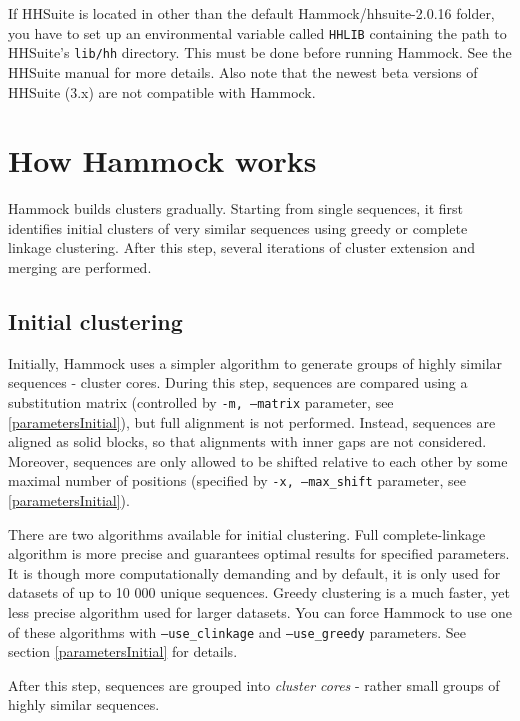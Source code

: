 \documentclass[11pt, a4paper, twoside, titlepage]{article}
\begin{document}
If HHSuite is located in other than the default Hammock/hhsuite-2.0.16 folder, you have to set up an environmental variable called \texttt{HHLIB} containing the path to HHSuite's \texttt{lib/hh} directory. This must be done before running Hammock. See the HHSuite manual for more details. Also note that the newest beta versions of HHSuite (3.x) are not compatible with Hammock. 


\section{How Hammock works}
\label{howhammockworks}
Hammock builds clusters gradually. Starting from single sequences, it first identifies initial clusters of very similar sequences using greedy or complete linkage clustering. After this step, several iterations of cluster extension and merging are performed.

\subsection{Initial clustering}
Initially, Hammock uses a simpler algorithm to generate groups of highly similar sequences - cluster cores. During this step, sequences are compared using a substitution matrix (controlled by \texttt{-m, --matrix} parameter, see \ref{parametersInitial}), but full alignment is not performed. Instead, sequences are aligned as solid blocks, so that alignments with inner gaps are not considered. Moreover, sequences are only allowed to be shifted relative to each other by some maximal number of positions (specified by \texttt{-x, --max\_shift} parameter, see \ref{parametersInitial}). 

There are two algorithms available for initial clustering. Full complete-linkage algorithm is more precise and guarantees optimal results for specified parameters. It is though more computationally demanding and by default, it is only used for datasets of up to 10 000 unique sequences. Greedy clustering is a much faster, yet less precise algorithm used for larger datasets. You can force Hammock to use one of these algorithms with \texttt{--use\_clinkage} and \texttt{--use\_greedy} parameters. See section \ref{parametersInitial} for details.

After this step, sequences are grouped into \emph{cluster cores} - rather small groups of highly similar sequences.
\end{document}
